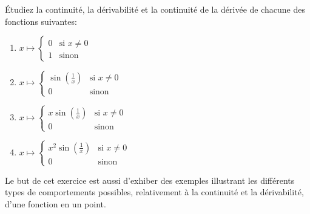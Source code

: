 
\begin{exercice}\label{exo0035}


Étudiez la continuité, la dérivabilité et la continuité de la dérivée de chacune des fonctions suivantes:
\begin{enumerate}
	\item $x \mapsto \left\{ \begin{array}{ll} 0 & \mbox{si } x \not= 0 \\ 1 & \mbox{sinon} \end{array} \right.  $
	\item $x \mapsto \left\{ \begin{array}{ll} \sin(\frac{1}{x}) & \mbox{si } x \not= 0 \\ 0 & \mbox{sinon} \end{array} \right.  $
	\item $x \mapsto \left\{ \begin{array}{ll} x \sin(\frac{1}{x}) & \mbox{si } x \not= 0 \\ 0 & \mbox{sinon} \end{array} \right. $
	\item\label{Item0035d} $x \mapsto \left\{ \begin{array}{ll} x^2 \sin(\frac{1}{x}) & \mbox{si } x \not= 0 \\ 0 & \mbox{sinon} \end{array} \right.  $
\end{enumerate}
Le but de cet exercice est aussi d'exhiber des exemples illustrant les différents types de comportements possibles, relativement à la continuité et la dérivabilité, d'une fonction en un point.

\end{exercice}
